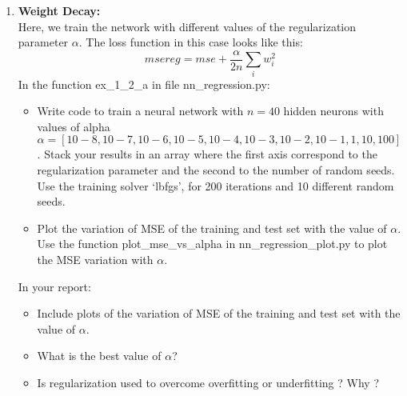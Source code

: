 \documentclass[a4paper]{article}
\begin{document}
\begin{enumerate}[label=(\alph*)]
	\item \textbf{Weight Decay:}\\
    Here, we train the network with different values of the regularization parameter $\alpha$. The loss function in this case looks like this:
    \[
    	msereg = mse + \frac{\alpha}{2n}\sum_i w_i^2
    \]
    In the function ex\_1\_2\_a in file nn\_regression.py:
    \begin{itemize}
        \item Write code to train a neural network with $n = 40$ hidden neurons with values of alpha $\alpha = [10−8, 10−7, 10−6, 10−5, 10−4, 10−3, 10−2, 10−1, 1, 10, 100]$. Stack your results in an array where the first axis correspond to the regularization parameter and the second to the number of random seeds. Use the training solver ‘lbfgs’, for 200 iterations and 10 different random seeds.
        \item Plot the variation of MSE of the training and test set with the value of $\alpha$. Use the function plot\_mse\_vs\_alpha in nn\_regression\_plot.py to plot the MSE variation with $\alpha$.
    \end{itemize}
    In your report:
	\begin{itemize}
        \item Include plots of the variation of MSE of the training and test set with the value of $\alpha$.
        \item What is the best value of $\alpha$?
        \item Is regularization used to overcome overfitting or underfitting ? Why ?
	\end{itemize}
    

\end{enumerate}
\end{document}
